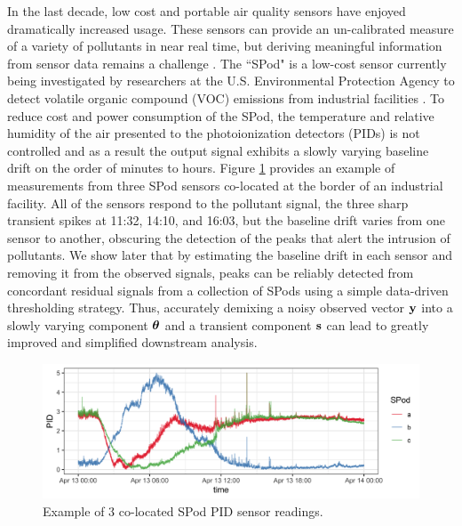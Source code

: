 \documentclass[aoas]{imsart}
\newcommand{\V}[1]{{\bm{\mathbf{\MakeLowercase{#1}}}}} %
\begin{document}
In the last decade, low cost and portable air quality sensors have enjoyed dramatically increased usage. These sensors can provide an un-calibrated measure of a variety of pollutants in near real time, but deriving meaningful information from sensor data remains a challenge \citep{snyder2013changing}. The ``SPod" is a low-cost sensor currently being investigated by researchers at the U.S. Environmental Protection Agency to detect volatile organic compound (VOC) emissions from industrial facilities \citep{thoma2016south}. To reduce cost and power consumption of the SPod, the temperature and relative humidity of the air presented to the photoionization detectors (PIDs) is not controlled and as a result the output signal exhibits a slowly varying baseline drift on the order of minutes to hours. Figure \ref{fig:raw_spod} provides an example of measurements from three SPod sensors co-located at the border of an industrial facility. All of the sensors respond to the pollutant signal, the three sharp transient spikes at 11:32, 14:10, and 16:03, but the baseline drift varies from one sensor to another, obscuring the detection of the peaks that alert the intrusion of pollutants. We show later that by estimating the baseline drift in each sensor %
and  removing it from the observed signals, peaks can be reliably detected from concordant residual signals from a collection of SPods using a simple data-driven thresholding strategy. Thus, accurately demixing a noisy observed vector $\V{y}$ into a slowly varying component $\V{\theta}$ and a transient component $\V{s}$ can lead to greatly improved and simplified downstream analysis. 

\begin{figure}[t!]
	\includegraphics[width = \linewidth]{Figures/uncorrected_data.png}
	\caption{Example of 3 co-located SPod PID sensor readings.}
	\label{fig:raw_spod}
\end{figure}
\end{document}
